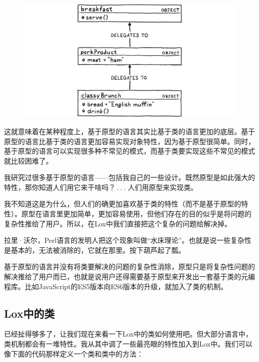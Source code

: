 \documentclass[cn,10pt,math=newtx,citestyle=gb7714-2015,bibstyle=gb7714-2015]{elegantbook}
\begin{document}
\begin{figure}[h]
\centering
\includegraphics[width=\textwidth]{image/the-lox-language/prototype-lookup.png}
\end{figure}

这就意味着在某种程度上，基于原型的语言其实比基于类的语言更加的底层。基于原型的语言比基于类的语言更加容易实现对象特性，因为基于原型很简单。同时，基于原型的语言可以实现很多种不常见的模式，而基于类要实现这些不常见的模式就比较困难了。

我研究过很多基于原型的语言——包括我自己的一些设计。既然原型是如此强大的特性，那你知道人们用它来干啥吗？ . . . 人们用原型来实现类。

我不知道这是为什么，但人们的确更加喜欢基于类的特性（而不是基于原型的特性）。原型在语言里更加简单，更加容易使用，但他们存在的目的似乎是将问题的复杂性推给了用户。所以，在Lox中我们直接把这个复杂的问题给解决掉。

\begin{tcolorbox}
拉里·沃尔，Perl语言的发明人把这个现象叫做“水床理论”。也就是说一些复杂性是基本的，无法被消除的，它就在那里。按下葫芦起了瓢。

基于原型的语言并没有将类要解决的问题的复杂性消除，原型只是将复杂性问题的解决推给了用户而已，也就是说用户还得需要基于原型来开发出一套基于类的元编程库。比如JavaScript的ES5版本向ES6版本的升级，就加入了类的机制。
\end{tcolorbox}

\subsection{Lox中的类}

已经扯得够多了，让我们现在来看一下Lox中的类如何使用吧。但大部分语言中，类机制都会有一堆特性。我从其中调了一些最亮眼的特性加入到Lox中。我们可以像下面的代码那样定义一个类和类中的方法：
\end{document}
